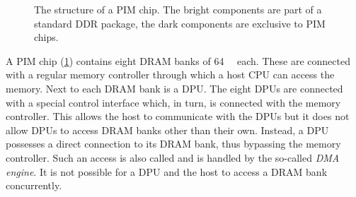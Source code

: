 \begin{figure}

	\caption{
		The structure of a \ac{PIM} chip.
		The bright components are part of a standard \ac{DDR} package, the dark components are exclusive to \ac{PIM} chips.
	}
	\label{fig:arch:chip}
\end{figure}

A \ac{PIM} chip (\cref{fig:arch:chip}) contains eight \ac{DRAM} banks of \qty{64}{\mebi\byte} each.
These are connected with a regular memory controller through which a host \ac{CPU} can access the memory.
Next to each \ac{DRAM} bank is a \ac{DPU}.
The eight \acp{DPU} are connected with a special control interface which, in turn, is connected with the memory controller.
This allows the host to communicate with the \acp{DPU} but it does not allow \acp{DPU} to access \ac{DRAM} banks other than their own.
Instead, a \ac{DPU} possesses a direct connection to its \ac{DRAM} bank, thus bypassing the memory controller.
Such an access is also called  and is handled by the so-called \emph{\ac{DMA} engine}.
It is not possible for a \ac{DPU} and the host to access a \ac{DRAM} bank concurrently.

